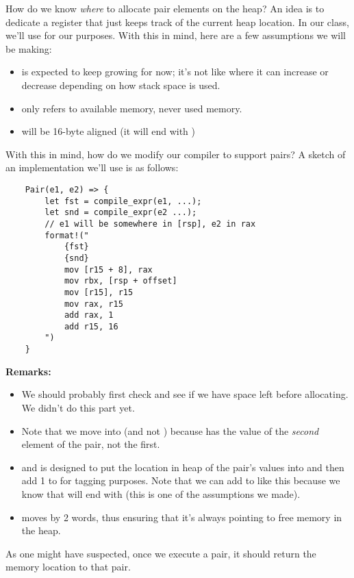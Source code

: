 \documentclass[letterpaper]{article}
\begin{document}
How do we know \emph{where} to allocate pair elements on the heap? An idea is to dedicate a register that just keeps track of the current heap location. In our class, we'll use  for our purposes. With this in mind, here are a few assumptions we will be making:
\begin{itemize}
    \item {} is expected to keep growing for now; it's not like  where it can increase or decrease depending on how stack space is used. 
    \item {} only refers to available memory, never used memory. 
    \item {} will be 16-byte aligned (it will end with )
\end{itemize}
With this in mind, how do we modify our compiler to support pairs? A sketch of an implementation we'll use is as follows: 
\begin{verbatim}
    Pair(e1, e2) => {
        let fst = compile_expr(e1, ...);
        let snd = compile_expr(e2 ...);
        // e1 will be somewhere in [rsp], e2 in rax 
        format!("
            {fst}
            {snd}
            mov [r15 + 8], rax 
            mov rbx, [rsp + offset]
            mov [r15], r15
            mov rax, r15 
            add rax, 1 
            add r15, 16
        ")
    }\end{verbatim}
\textbf{Remarks:} 
\begin{itemize}
    \item We should probably first check and see if we have space left before allocating. We didn't do this part yet.  
    \item Note that we move  into \code{[r15 + 8]} (and not \code{[r15]}) because  has the value of the \emph{second} element of the pair, not the first. 
    \item {} and  is designed to put the location in heap of the pair's values into  and then add 1 to  for tagging purposes. Note that we can add  to  like this because we know that  will end with  (this is one of the assumptions we made). 
    \item {} moves  by 2 words, thus ensuring that it's always pointing to free memory in the heap. 
\end{itemize}
As one might have suspected, once we execute a pair, it should return the memory location to that pair. 
\end{document}
